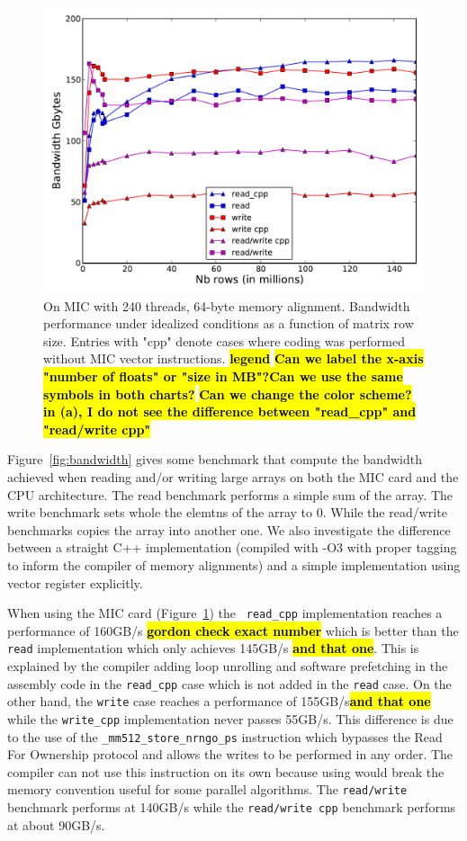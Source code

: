 \documentclass[10pt,conference,compsocconf]{IEEEtran}
\newcommand{\todo}[1]{{\color{red}\textbf{\hl{#1}}\xspace}}
\begin{document}
\begin{figure}[bth]
  \centering
  \includegraphics[width=.9\linewidth]{figures/bandwidth_read_write.pdf}
  
  \caption{On MIC with 240 threads, 64-byte memory
    alignment. Bandwidth performance under idealized
    conditions as a function of matrix row size.  Entries with "cpp"
    denote cases where coding was performed without MIC vector
    instructions. \todo{legend}  \todo{Can we label the x-axis "number of floats" or
      "size in MB"?}\todo{Can we use the same symbols in both charts?}
    \todo{Can we change the color scheme? in (a), I do not see the
      difference between "read\_cpp" and "read/write cpp"} }
  \label{fig:bandwidth}
  \label{fig:band_rw_MIC}
\end{figure}

Figure~\ref{fig:bandwidth} gives some benchmark that compute the
bandwidth achieved when reading and/or writing large arrays on both
the MIC card and the CPU architecture. The read benchmark performs a
simple sum of the array. The write benchmark sets whole the elemtns of
the array to 0. While the read/write benchmarks copies the array into
another one. We also investigate the difference between a straight C++
implementation (compiled with -O3 with proper tagging to inform the
compiler of memory alignments) and a simple implementation using
vector register explicitly.

When using the MIC card (Figure~\ref{fig:band_rw_MIC}) the {\tt
  read\_cpp} implementation reaches a performance of 160GB/s
\todo{gordon check exact number} which is better than the {\tt read}
implementation which only achieves 145GB/s \todo{and that one}. This
is explained by the compiler adding loop unrolling and software
prefetching in the assembly code in the {\tt read\_cpp} case which is
not added in the {\tt read} case. On the other hand, the {\tt write}
case reaches a performance of 155GB/s\todo{and that one} while the
{\tt write\_cpp} implementation never passes 55GB/s. This difference
is due to the use of the {\tt \_mm512\_store\_nrngo\_ps} instruction
which bypasses the Read For Ownership protocol and allows the writes
to be performed in any order. The compiler can not use this
instruction on its own because using would break the memory convention
useful for some parallel algorithms. The {\tt read/write} benchmark
performs at 140GB/s while the {\tt read/write cpp} benchmark performs
at about 90GB/s.
\end{document}

